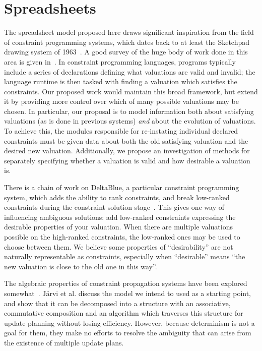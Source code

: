 \section{Spreadsheets}
The spreadsheet model proposed here draws significant inspiration from the
field of constraint programming systems, which dates back to at least the
Sketchpad drawing system of 1963~\cite{sutherland1964sketch}. A good survey
of the huge body of work done in this area is given
in~\cite{wallace1996practical}.
%
In constraint programming languages, programs typically include a series of
declarations defining what valuations are valid and invalid; the language
runtime is then tasked with finding a valuation which satisfies the
constraints. Our proposed work would maintain this broad framework, but
extend it by providing more control over which of many possible valuations
may be chosen. In particular, our proposal is to model information both
about satisfying valuations (as is done in previous systems) \emph{and}
about the evolution of valuations. To achieve this, the modules responsible
for re-instating individual declared constraints must be given data about
both the old satisfying valuation and the desired new valuation.
Additionally, we propose an investigation of methods for separately
specifying whether a valuation is valid and how desirable a valuation is.

There is a chain of work on DeltaBlue, a particular constraint programming
system, which adds the ability to rank constraints, and break low-ranked
constraints during the constraint solution
stage~\cite{sannella1994analyzing,sannella1994skyblue,sannella1993multi}.
This gives one way of influencing ambiguous solutions: add low-ranked
constraints expressing the desirable properties of your valuation. When
there are multiple valuations possible on the high-ranked constraints, the
low-ranked ones may be used to choose between them. We believe some
properties of ``desirability'' are not naturally representable as
constraints, especially when ``desirable'' means ``the new valuation is
close to the old one in this way''.


The algebraic properties of constraint propagation systems have been
explored somewhat~\cite{jarvi2012expressing}. J\"arvi et al. discuss the
model we intend to used as a starting point, and show that it can be
decomposed into a structure with an associative, commutative composition and
an algorithm which traverses this structure for update planning without
losing efficiency. However, because determinism is not a goal for them, they
make no efforts to resolve the ambiguity that can arise from the existence
of multiple update plans.

